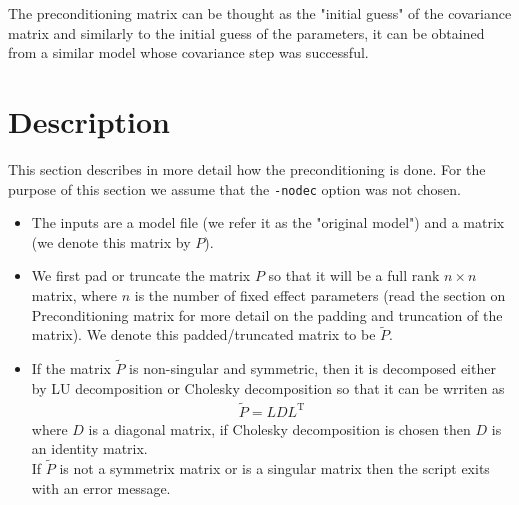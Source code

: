 The preconditioning matrix can be thought as the "initial guess" of the covariance matrix and similarly to the initial guess of the parameters, it can be obtained from a similar model whose covariance step was successful.


\section{Description}

This section describes in more detail how the preconditioning is done. For the purpose of this section we assume that the \verb;-nodec; option was not chosen.

\begin{itemize}
    \item The inputs are a model file (we refer it as the "original model") and a matrix (we denote this matrix by $P$).
    \item We first pad or truncate the matrix $P$ so that it will be a full rank $n \times n$ matrix, where $n$ is the number of fixed effect parameters (read the section on Preconditioning matrix for more detail on the padding and truncation of the matrix).  We denote this padded/truncated matrix to be $\tilde{P}$.
    \item If the matrix $\tilde{P}$ is non-singular and symmetric, then it is decomposed either by LU decomposition or Cholesky decomposition so that it can be wrriten as 
    \begin{eqnarray*}
    \tilde{P}=LDL^\textrm{T}
    \end{eqnarray*}
    where $D$ is a diagonal matrix, if Cholesky decomposition is chosen then $D$ is an identity matrix.\\
    If $\tilde{P}$ is not a symmetrix matrix or is a singular matrix then the script exits with an error message.


\end{itemize}
